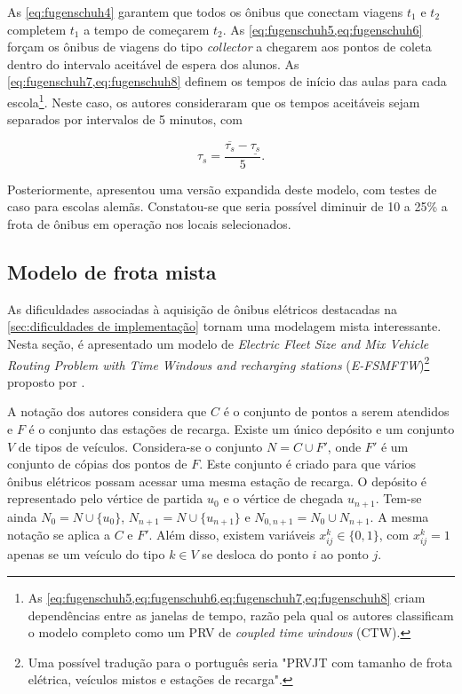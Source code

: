 As \cref{eq:fugenschuh4} garantem que todos os ônibus que conectam viagens $t_1$ e $t_2$ completem $t_1$ a tempo de começarem $t_2$. As \cref{eq:fugenschuh5,eq:fugenschuh6} forçam os ônibus de viagens do tipo \emph{collector} a chegarem aos pontos de coleta dentro do intervalo aceitável de espera dos alunos. As \cref{eq:fugenschuh7,eq:fugenschuh8} definem os tempos de início das aulas para cada escola\footnote{As \cref{eq:fugenschuh5,eq:fugenschuh6,eq:fugenschuh7,eq:fugenschuh8} criam dependências entre as janelas de tempo, razão pela qual os autores classificam o modelo completo como um PRV de \emph{coupled time windows} (CTW).}. Neste caso, os autores consideraram que os tempos aceitáveis sejam separados por intervalos de 5 minutos, com

\begin{equation}
    \tau_s = \frac{\overline{\tau_s} - \underline{\tau_s}}{5}.
\end{equation}

Posteriormente, \textcite{FÜGENSCHUH:09} apresentou uma versão expandida deste modelo, com testes de caso para escolas alemãs. Constatou-se que seria possível diminuir de 10 a 25\% a frota de ônibus em operação nos locais selecionados.

\subsection{Modelo de frota mista}
As dificuldades associadas à aquisição de ônibus elétricos destacadas na \cref{sec:dificuldades de implementação} tornam uma modelagem mista interessante. Nesta seção, é apresentado um modelo de \emph{Electric Fleet Size and Mix Vehicle Routing Problem with Time Windows and recharging stations} (\emph{E-FSMFTW})\footnote{Uma possível tradução para o português seria "PRVJT com tamanho de frota elétrica, veículos mistos e estações de recarga".} proposto por \textcite{HIERMANN:16}.

A notação dos autores considera que $C$ é o conjunto de pontos a serem atendidos e $F$ é o conjunto das estações de recarga. Existe um único depósito e um conjunto $V$ de tipos de veículos. Considera-se o conjunto $N = C \cup F'$, onde $F'$ é um conjunto de cópias dos pontos de $F$. Este conjunto é criado para que vários ônibus elétricos possam acessar uma mesma estação de recarga. O depósito é representado pelo vértice de partida $u_0$ e o vértice de chegada $u_{n+1}$. Tem-se ainda $N_0 = N \cup \{u_0\}$, $N_{n+1} = N \cup \{u_{n+1}\}$ e $N_{0,n+1} = N_0 \cup N_{n+1}$. A mesma notação se aplica a $C$ e $F'$. Além disso, existem variáveis $x_{ij}^k \in \{0,1\}$, com $x_{ij}^k = 1$ apenas se um veículo do tipo $k \in V$ se desloca do ponto $i$ ao ponto $j$.

